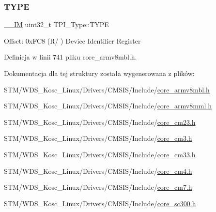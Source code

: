 \subsubsection{\texorpdfstring{T\+Y\+PE}{TYPE}}
{\footnotesize\ttfamily \hyperlink{core__sc300_8h_a4cc1649793116d7c2d8afce7a4ffce43}{\+\_\+\+\_\+\+IM} uint32\+\_\+t T\+P\+I\+\_\+\+Type\+::\+T\+Y\+PE}

Offset\+: 0x\+F\+C8 (R/ ) Device Identifier Register 

Definicja w linii 741 pliku core\+\_\+armv8mbl.\+h.



Dokumentacja dla tej struktury została wygenerowana z plików\+:\begin{DoxyCompactItemize}
\item 
S\+T\+M/\+W\+D\+S\+\_\+\+Kosc\+\_\+\+Linux/\+Drivers/\+C\+M\+S\+I\+S/\+Include/\hyperlink{core__armv8mbl_8h}{core\+\_\+armv8mbl.\+h}\item 
S\+T\+M/\+W\+D\+S\+\_\+\+Kosc\+\_\+\+Linux/\+Drivers/\+C\+M\+S\+I\+S/\+Include/\hyperlink{core__armv8mml_8h}{core\+\_\+armv8mml.\+h}\item 
S\+T\+M/\+W\+D\+S\+\_\+\+Kosc\+\_\+\+Linux/\+Drivers/\+C\+M\+S\+I\+S/\+Include/\hyperlink{core__cm23_8h}{core\+\_\+cm23.\+h}\item 
S\+T\+M/\+W\+D\+S\+\_\+\+Kosc\+\_\+\+Linux/\+Drivers/\+C\+M\+S\+I\+S/\+Include/\hyperlink{core__cm3_8h}{core\+\_\+cm3.\+h}\item 
S\+T\+M/\+W\+D\+S\+\_\+\+Kosc\+\_\+\+Linux/\+Drivers/\+C\+M\+S\+I\+S/\+Include/\hyperlink{core__cm33_8h}{core\+\_\+cm33.\+h}\item 
S\+T\+M/\+W\+D\+S\+\_\+\+Kosc\+\_\+\+Linux/\+Drivers/\+C\+M\+S\+I\+S/\+Include/\hyperlink{core__cm4_8h}{core\+\_\+cm4.\+h}\item 
S\+T\+M/\+W\+D\+S\+\_\+\+Kosc\+\_\+\+Linux/\+Drivers/\+C\+M\+S\+I\+S/\+Include/\hyperlink{core__cm7_8h}{core\+\_\+cm7.\+h}\item 
S\+T\+M/\+W\+D\+S\+\_\+\+Kosc\+\_\+\+Linux/\+Drivers/\+C\+M\+S\+I\+S/\+Include/\hyperlink{core__sc300_8h}{core\+\_\+sc300.\+h}\end{DoxyCompactItemize}
